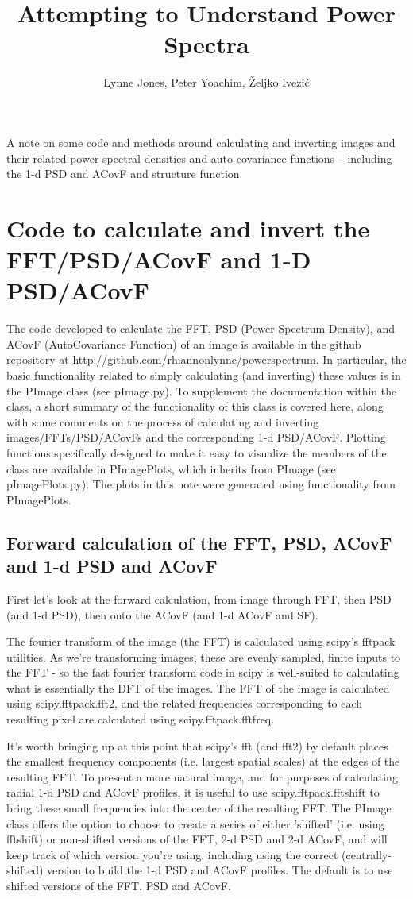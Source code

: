 \documentclass[11pt,preprint]{aastex}
\begin{document}
\title{Attempting to Understand Power Spectra}
\author{Lynne Jones, Peter Yoachim, {\v Z}eljko Ivezi{\'c}}



A note on some code and methods around calculating and inverting images and their related power spectral densities and auto covariance functions -- including the 1-d PSD and ACovF and structure function.

\section{Code to calculate and invert the FFT/PSD/ACovF and 1-D PSD/ACovF}

The code developed to calculate the FFT, PSD (Power Spectrum Density), and ACovF (AutoCovariance Function) of an image is available in the github repository at \url{http://github.com/rhiannonlynne/powerspectrum}. In particular, the basic functionality related to simply calculating (and inverting) these values is in the PImage class (see pImage.py). To supplement the documentation within the class, a short summary of the functionality of this class is covered here, along with some comments on the process of calculating and inverting images/FFTs/PSD/ACovFs and the corresponding 1-d PSD/ACovF.  Plotting functions specifically designed to make it easy to visualize the members of the class are available in PImagePlots, which inherits from PImage (see pImagePlots.py). The plots in this note were generated using functionality from PImagePlots.

\subsection{Forward calculation of the FFT, PSD, ACovF and 1-d PSD and ACovF}

First let's look at the forward calculation, from image through FFT, then PSD (and 1-d PSD), then onto the ACovF (and 1-d ACovF and SF). 

The fourier transform of the image (the FFT) is calculated using scipy's fftpack utilities. As we're transforming images, these are evenly sampled, finite inputs to the FFT - so the fast fourier transform code in scipy is well-suited to calculating what is essentially the DFT of the images. The FFT of the image is calculated using scipy.fftpack.fft2, and the related frequencies corresponding to each resulting pixel are calculated using scipy.fftpack.fftfreq.  

It's worth bringing up at this point that scipy's fft (and fft2) by default places the smallest frequency components (i.e. largest spatial scales) at the edges of the resulting FFT. To present a more natural image, and for purposes of calculating radial 1-d PSD and ACovF profiles, it is useful to use scipy.fftpack.fftshift to bring these small frequencies into the center of the resulting FFT. The PImage class offers the option to choose to create a series of either 'shifted' (i.e. using fftshift) or non-shifted versions of the FFT, 2-d PSD and 2-d ACovF, and will keep track of which version you're using, including using the correct (centrally-shifted) version to build the 1-d PSD and ACovF profiles. The default is to use shifted versions of the FFT, PSD and ACovF. 
\end{document}
